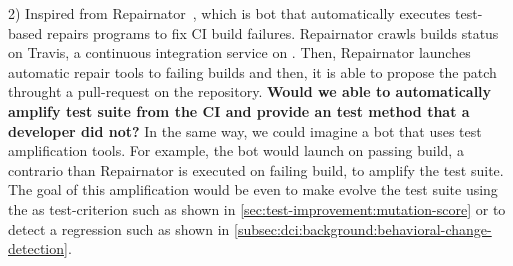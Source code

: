 2) Inspired from Repairnator~\cite{urli:hal-01691496}, which is bot that automatically executes test-based repairs programs to fix CI build failures.
Repairnator crawls builds status on Travis, a continuous integration service on \gh.
Then, Repairnator launches automatic repair tools to failing builds and then, it is able to propose the patch throught a pull-request on the \gh repository.
\textbf{Would we able to automatically amplify test suite from the CI and provide an test method that a developer did not?}
In the same way, we could imagine a bot that uses test amplification tools.
For example, the bot would launch \dspot on passing build, a contrario than Repairnator is executed on failing build, to amplify the test suite.
The goal of this amplification would be even to make evolve the test suite using the \ms as test-criterion such as shown in \autoref{sec:test-improvement:mutation-score} or to detect a regression such as shown in \autoref{subsec:dci:background:behavioral-change-detection}.
